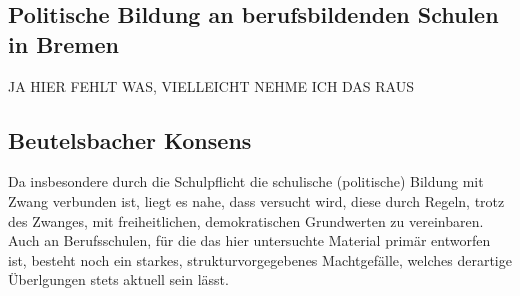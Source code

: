 
\subsection{Politische Bildung an berufsbildenden Schulen in Bremen}
JA HIER FEHLT WAS, VIELLEICHT NEHME ICH DAS RAUS

\subsection{Beutelsbacher Konsens \label{bbk}}%
Da insbesondere durch die Schulpflicht \autocite{BremSchulG} die schulische (politische) Bildung mit Zwang verbunden ist, liegt es nahe, dass versucht wird, diese durch Regeln, trotz des Zwanges, mit freiheitlichen, demokratischen Grundwerten zu vereinbaren. Auch an Berufsschulen, für die das hier untersuchte Material primär entworfen ist, besteht noch ein starkes, strukturvorgegebenes Machtgefälle, welches derartige Überlgungen stets aktuell sein lässt. 


